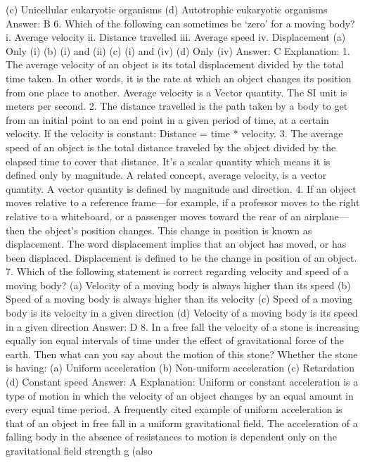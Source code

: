 (c) Unicellular eukaryotic organisms
(d) Autotrophic eukaryotic organisms
Answer: B
6. Which of the following can sometimes be ‘zero’ for a moving
body?
i. Average velocity
ii. Distance travelled
iii. Average speed
iv. Displacement
(a) Only (i)
(b) (i) and (ii)
(c) (i) and (iv)
(d) Only (iv)
Answer: C
Explanation:
1. The average velocity of an object is its total displacement divided
by the total time taken. In other words, it is the rate at which an
object changes its position from one place to another. Average
velocity is a Vector quantity. The SI unit is meters per second.
2. The distance travelled is the path taken by a body to get from an
initial point to an end point in a given period of time, at a certain
velocity. If the velocity is constant: Distance = time * velocity.
3. The average speed of an object is the total distance traveled by
the object divided by the elapsed time to cover that distance. It's a
scalar quantity which means it is defined only by magnitude. A
related concept, average velocity, is a vector quantity. A vector
quantity is defined by magnitude and direction.
4. If an object moves relative to a reference frame—for example, if
a professor moves to the right relative to a whiteboard, or a
passenger moves toward the rear of an airplane—then the object’s
position changes. This change in position is known as displacement.
The word displacement implies that an object has moved, or has
been displaced.
Displacement is defined to be the change in position of an object.
7. Which of the following statement is correct regarding velocity
and speed of a moving body?
(a) Velocity of a moving body is always higher than its speed
(b) Speed of a moving body is always higher than its velocity
(c) Speed of a moving body is its velocity in a given direction
(d) Velocity of a moving body is its speed in a given direction
Answer: D
8. In a free fall the velocity of a stone is increasing equally ion
equal intervals of time under the effect of gravitational force of
the earth. Then what can you say about the motion of this
stone? Whether the stone is having:
(a) Uniform acceleration
(b) Non-uniform acceleration
(c) Retardation
(d) Constant speed
Answer: A
Explanation: Uniform or constant acceleration is a type of motion in
which the velocity of an object changes by an equal amount in every
equal time period.
A frequently cited example of uniform acceleration is that of an
object in free fall in a uniform gravitational field.
The acceleration of a falling body in the absence of resistances to
motion is dependent only on the gravitational field strength g (also

